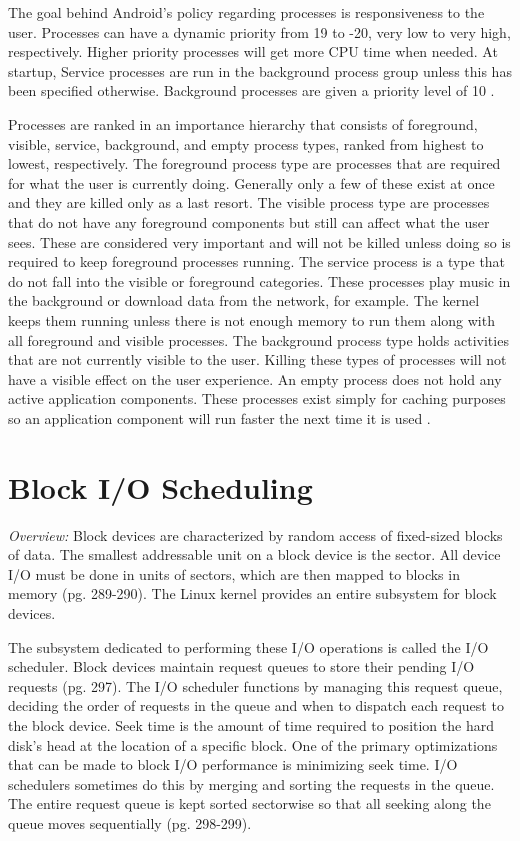 \documentclass[letterpaper,10pt,titlepage]{article}
\newcommand{\tab}{\hspace*{2em}} %
\begin{document}
\tab The goal behind Android's policy regarding processes is responsiveness to the user. Processes can have a dynamic priority from 19 to -20, very low to very high, respectively. Higher priority processes will get more CPU time when needed. At startup, Service processes are run in the background process group unless this has been specified otherwise. Background processes are given a priority level of 10 \cite{gomo}.

\tab Processes are ranked in an importance hierarchy that consists of foreground, visible, service, background, and empty process types, ranked from highest to lowest, respectively. The foreground process type are processes that are required for what the user is currently doing. Generally only a few of these exist at once and they are killed only as a last resort. The visible process type are processes that do not have any foreground components but still can affect what the user sees. These are considered very important and will not be killed unless doing so is required to keep foreground processes running. The service process is a type that do not fall into the visible or foreground categories. These processes play music in the background or download data from the network, for example. The kernel keeps them running unless there is not enough memory to run them along with all foreground and visible processes. The background process type holds activities that are not currently visible to the user. Killing these types of processes will not have a visible effect on the user experience. An empty process does not hold any active application components. These processes exist simply for caching purposes so an application component will run faster the next time it is used \cite{AndroidDev1}.

\newpage
\section{Block I/O Scheduling}

\tab \emph{Overview:} Block devices are characterized by random access of fixed-sized blocks of data. The smallest addressable unit on a block device is the sector. All device I/O must be done in units of sectors, which are then mapped to blocks in memory \cite{Love}(pg. 289-290). The Linux kernel provides an entire subsystem for block devices. 

\tab The subsystem dedicated to performing these I/O operations is called the I/O scheduler. Block devices maintain request queues to store their pending I/O requests \cite{Love}(pg. 297). The I/O scheduler functions by managing this request queue, deciding the order of requests in the queue and when to dispatch each request to the block device. Seek time is the amount of time required to position the hard disk's head at the location of a specific block. One of the primary optimizations that can be made to block I/O performance is minimizing seek time. I/O schedulers sometimes do this by merging and sorting the requests in the queue. The entire request queue is kept sorted sectorwise so that all seeking along the queue moves sequentially \cite{Love}(pg. 298-299). 
\end{document}
